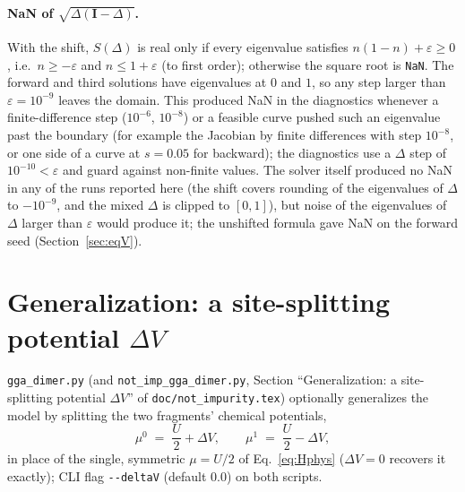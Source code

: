 \documentclass[11pt]{article}
\begin{document}
\paragraph{NaN of $\sqrt{\Delta(\mathbf I-\Delta)}$.} With the shift, $S(\Delta)$
is real only if every eigenvalue satisfies $n(1-n)+\varepsilon\ge0$, i.e.\ $n\ge-\varepsilon$
and $n\le1+\varepsilon$ (to first order); otherwise the square root is \texttt{NaN}.
The forward and third solutions have eigenvalues at $0$ and $1$, so any step
larger than $\varepsilon=10^{-9}$ leaves the domain. This produced NaN in the
diagnostics whenever a finite-difference step ($10^{-6}$, $10^{-8}$) or a
feasible curve pushed such an eigenvalue past the boundary (for example the Jacobian
by finite differences with step $10^{-8}$, or one side of a curve at $s=0.05$
for backward); the diagnostics use a $\Delta$ step of $10^{-10}<\varepsilon$ and guard against
non-finite values. The solver itself produced no NaN in any of the runs reported
here (the shift covers rounding of the eigenvalues of $\Delta$ to $-10^{-9}$, and
the mixed $\Delta$ is clipped to $[0,1]$), but noise of the eigenvalues of
$\Delta$ larger than $\varepsilon$ would produce it; the unshifted formula gave NaN
on the forward seed (Section~\ref{sec:eqV}).

\section{Generalization: a site-splitting potential $\Delta V$}
\label{sec:deltaV}

\texttt{gga\_dimer.py} (and \texttt{not\_imp\_gga\_dimer.py}, Section ``Generalization:
a site-splitting potential $\Delta V$'' of \texttt{doc/not\_impurity.tex}) optionally
generalizes the model by splitting the two fragments' chemical potentials,
\begin{equation}
  \boxed{\;
  \mu^{0} \;=\; \frac{U}{2}+\Delta V, \qquad \mu^{1} \;=\; \frac{U}{2}-\Delta V,
  \;}
  \label{eq:muDeltaV}
\end{equation}
in place of the single, symmetric $\mu=U/2$ of Eq.~\eqref{eq:Hphys} ($\Delta V=0$
recovers it exactly); CLI flag \texttt{-{}-deltaV} (default $0.0$) on both scripts.
\end{document}
